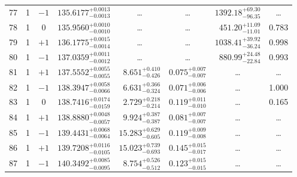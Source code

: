 \begin{table*}[!]
\begin{tabular}{llcrrlrc}
77 & 1 & $-1$ & $    135.6177_{-      0.0013}^{+      0.0013}$ & \multicolumn{1}{c}{\dots} & \multicolumn{1}{c}{\dots} & $     1392.18_{-       96.35}^{+       69.30}$ & \dots \\[1pt]
78 & 1 & 0 & $    135.9560_{-      0.0010}^{+      0.0010}$ & \multicolumn{1}{c}{\dots} & \multicolumn{1}{c}{\dots} & $      451.20_{-       11.01}^{+       11.09}$ & 0.783 \\[1pt]
79 & 1 & $+1$ & $    136.1775_{-      0.0014}^{+      0.0015}$ & \multicolumn{1}{c}{\dots} & \multicolumn{1}{c}{\dots} & $     1038.41_{-       36.24}^{+       39.92}$ & 0.998 \\[1pt]
80 & 1 & $-1$ & $    137.0359_{-      0.0012}^{+      0.0011}$ & \multicolumn{1}{c}{\dots} & \multicolumn{1}{c}{\dots} & $      880.99_{-       22.84}^{+       24.48}$ & 0.993 \\[1pt]
81 & 1 & $+1$ & $    137.5552_{-      0.0055}^{+      0.0055}$ & $       8.651_{-       0.426}^{+       0.410}$ & $       0.075_{-       0.007}^{+       0.007}$ & \multicolumn{1}{c}{\dots} & \dots \\[1pt]
82 & 1 & $-1$ & $    138.3947_{-      0.0066}^{+      0.0058}$ & $       6.631_{-       0.324}^{+       0.366}$ & $       0.071_{-       0.006}^{+       0.006}$ & \multicolumn{1}{c}{\dots} & 1.000\\[1pt]
83 & 1 & 0 & $    138.7416_{-      0.0159}^{+      0.0174}$ & $       2.729_{-       0.214}^{+       0.218}$ & $       0.119_{-       0.010}^{+       0.011}$ & \multicolumn{1}{c}{\dots} & 0.165 \\[1pt]
84 & 1 & $+1$ & $    138.8880_{-      0.0057}^{+      0.0048}$ & $       9.924_{-       0.387}^{+       0.387}$ & $       0.081_{-       0.007}^{+       0.007}$ & \multicolumn{1}{c}{\dots} & \dots \\[1pt]
85 & 1 & $-1$ & $    139.4431_{-      0.0064}^{+      0.0068}$ & $      15.283_{-       0.605}^{+       0.629}$ & $       0.119_{-       0.008}^{+       0.009}$ & \multicolumn{1}{c}{\dots} & \dots \\[1pt]
86 & 1 & $+1$ & $    139.7208_{-      0.0105}^{+      0.0116}$ & $      15.023_{-       0.693}^{+       0.739}$ & $       0.145_{-       0.017}^{+       0.015}$ & \multicolumn{1}{c}{\dots} & \dots \\[1pt] 
87 & 1 & $-1$ & $    140.3492_{-      0.0095}^{+      0.0085}$ & $       8.754_{-       0.512}^{+       0.526}$ & $       0.123_{-       0.015}^{+       0.015}$ & \multicolumn{1}{c}{\dots} & \dots \\[1pt]

\end{tabular}
\end{table*}
